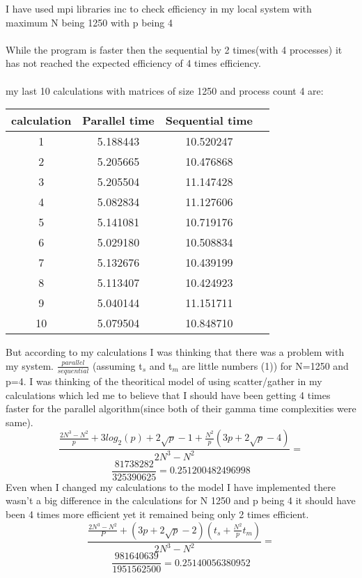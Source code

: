 I have used mpi libraries inc to check efficiency in my local system with maximum N being 1250 with p being 4\\
\\
While the program is faster then the sequential by 2 times(with 4 processes) it has not reached the expected efficiency of 4 times efficiency.\\
\\
my last 10 calculations with matrices of size 1250 and process count 4 are:
\begin{center}
	\begin{tabular}{ |c|c|c|c| } 
		\hline
		calculation & Parallel time & Sequential time \\ \hline
		1 & 5.188443 & 10.520247 \\ 
		2 & 5.205665 & 10.476868 \\ 
		3 & 5.205504 & 11.147428 \\ 
		4 & 5.082834 & 11.127606 \\ 
		5 & 5.141081 & 10.719176 \\ 
		6 & 5.029180 & 10.508834 \\ 
		7 & 5.132676 & 10.439199 \\ 
		8 & 5.113407 & 10.424923 \\ 
		9 & 5.040144 & 11.151711 \\ 
		10 & 5.079504 & 10.848710 \\ 
		\hline
	\end{tabular}
\end{center}
But according to my calculations I was thinking that there was a problem with my system. $\frac{parallel}{sequential}$ (assuming t$_s$ and t$_m$ are little numbers (1)) for N=1250 and p=4. I was thinking of the theoritical model of using scatter/gather in my calculations which led me to believe that I should have been getting 4 times faster for the parallel algorithm(since both of their gamma time complexities were same).
\[
\frac{\frac{2N^3-N^2}{p}+3log_2(p)+2\sqrt{p}-1+\frac{N^2}{p}(3p+2\sqrt{p}-4)}{2N^3-N^2}=
\]
\[\frac{81738282}{325390625}=0.251200482496998\]
Even when I changed my calculations to the model I have implemented there wasn't a big difference in the calculations for N 1250 and p being 4 it should have been 4 times more efficient yet it remained being only 2 times efficient. 
\[
\frac{\frac{2N^3-N^2}{P}+(3p+2\sqrt{p}-2)(t_s+\frac{N^2}{p}t_m)}{2N^3-N^2}=
\]
\[\frac{981640639}{1951562500}=0.25140056380952\]